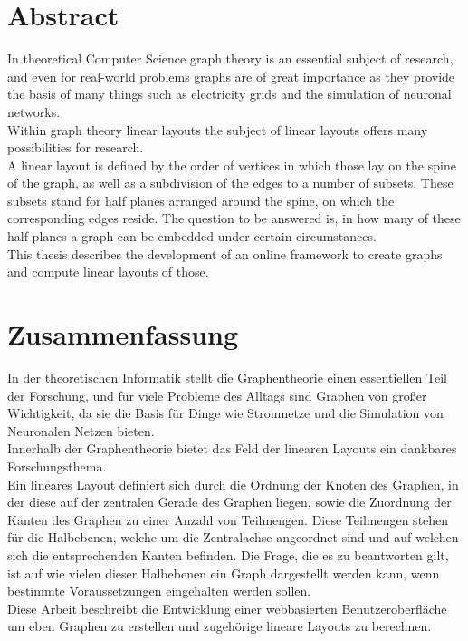 \documentclass[twoside,12pt,a4paper]{report}
\begin{document}

\setcounter{page}{1}



\section*{Abstract}
In theoretical Computer Science graph theory is an essential subject of research, and even for real-world problems graphs are of great importance as they provide the basis of many things such as electricity grids and the simulation of neuronal networks.\\
Within graph theory linear layouts the subject of linear layouts offers many possibilities for research.\\
A linear layout is defined by the order of vertices in which those lay on the spine of the graph, as well as a subdivision of the edges to a number of subsets. These subsets stand for half planes arranged around the spine, on which the corresponding edges reside. The question to be answered is, in how many of these half planes a graph can be embedded under certain circumstances.\\
This thesis describes the development of an online framework to create graphs and compute linear layouts of those.

\newpage
\section*{Zusammenfassung}
In der theoretischen Informatik stellt die Graphentheorie einen essentiellen Teil der Forschung, und für viele Probleme des Alltags sind Graphen von großer Wichtigkeit, da sie die Basis für Dinge wie Stromnetze und die Simulation von Neuronalen Netzen bieten.\\
Innerhalb der Graphentheorie bietet das Feld der linearen Layouts ein dankbares Forschungsthema.\\
Ein lineares Layout definiert sich durch die Ordnung der Knoten des Graphen, in der diese auf der zentralen Gerade des Graphen liegen, sowie die Zuordnung der Kanten des Graphen zu einer Anzahl von Teilmengen. Diese Teilmengen stehen für die Halbebenen, welche um die Zentralachse angeordnet sind und auf welchen sich die entsprechenden Kanten befinden. Die Frage, die es zu beantworten gilt, ist auf wie vielen dieser Halbebenen ein Graph dargestellt werden kann, wenn bestimmte Voraussetzungen eingehalten werden sollen.\\
Diese Arbeit beschreibt die Entwicklung einer webbasierten Benutzeroberfläche um eben Graphen zu erstellen und zugehörige lineare Layouts zu berechnen.
\newpage
\end{document}
